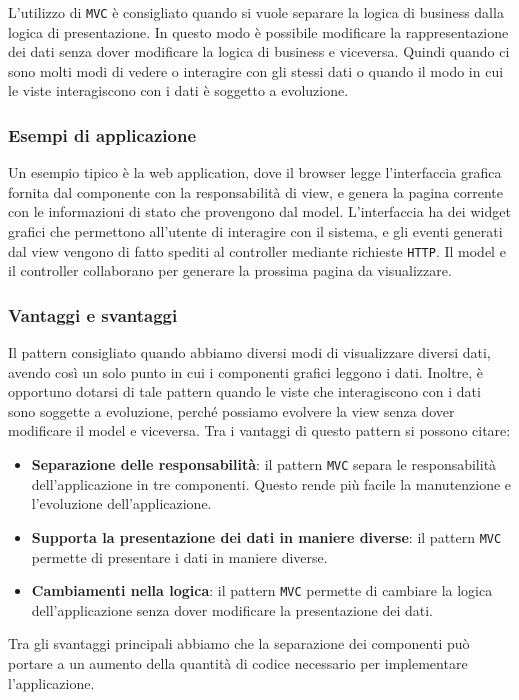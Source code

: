 L'utilizzo di \texttt{MVC} è consigliato quando si vuole separare la logica di business dalla
logica di presentazione. In questo modo è possibile modificare la rappresentazione
dei dati senza dover modificare la logica di business e viceversa. 
Quindi quando ci sono molti modi di vedere o interagire con gli stessi dati o quando il 
modo in cui le viste interagiscono con i dati è soggetto a evoluzione.
\subsubsection{Esempi di applicazione}
Un esempio tipico è la web application, dove il browser legge l'interfaccia 
grafica fornita dal componente con la responsabilità di view, e genera 
la pagina corrente con le informazioni di stato che provengono dal model. L'interfaccia 
ha dei widget grafici che permettono all'utente di interagire con il sistema, e gli 
eventi generati dal view vengono di fatto spediti al controller mediante richieste 
\texttt{HTTP}. Il model e il controller collaborano per generare la prossima 
pagina da visualizzare.

\subsubsection{Vantaggi e svantaggi}
Il pattern consigliato quando abbiamo diversi modi di visualizzare diversi dati, 
avendo così un solo punto in cui i componenti grafici leggono i dati. Inoltre, 
è opportuno dotarsi di tale pattern quando le viste che interagiscono con i dati
sono soggette a evoluzione, perché possiamo evolvere la view senza dover
modificare il model e viceversa.
Tra i vantaggi di questo pattern si possono citare:
\begin{itemize}
    \item \textbf{Separazione delle responsabilità}: il pattern \texttt{MVC} separa le responsabilità
    dell'applicazione in tre componenti. Questo rende più facile la manutenzione e l'evoluzione
    dell'applicazione.
    \item \textbf{Supporta la presentazione dei dati in maniere diverse}: il pattern \texttt{MVC}
    permette di presentare i dati in maniere diverse.
    \item \textbf{Cambiamenti nella logica}: il pattern \texttt{MVC} permette di cambiare la logica
    dell'applicazione senza dover modificare la presentazione dei dati.
\end{itemize}
Tra gli svantaggi principali abbiamo che la separazione dei componenti
può portare a un aumento
della quantità di codice necessario per implementare l'applicazione.
